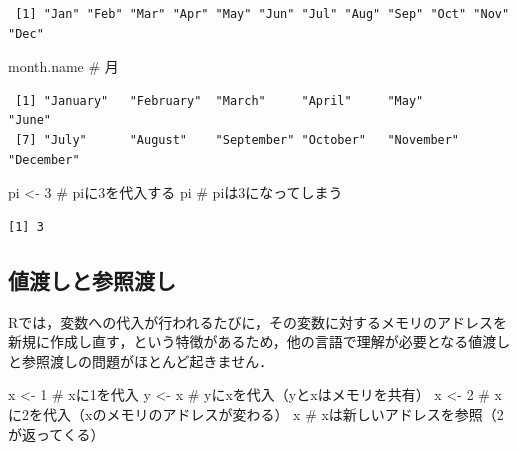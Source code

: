 \documentclass[
  letterpaper,
  DIV=11,
  numbers=noendperiod]{scrreprt}
\newenvironment{Shaded}{\begin{snugshade}}{\end{snugshade}}
\newcommand{\CommentTok}[1]{\textcolor[rgb]{0.37,0.37,0.37}{#1}}
\newcommand{\DecValTok}[1]{\textcolor[rgb]{0.68,0.00,0.00}{#1}}
\newcommand{\NormalTok}[1]{\textcolor[rgb]{0.00,0.23,0.31}{#1}}
\newcommand{\OtherTok}[1]{\textcolor[rgb]{0.00,0.23,0.31}{#1}}
\begin{document}
\begin{verbatim}
 [1] "Jan" "Feb" "Mar" "Apr" "May" "Jun" "Jul" "Aug" "Sep" "Oct" "Nov" "Dec"
\end{verbatim}

\begin{Shaded}
\begin{Highlighting}[]
\NormalTok{month.name }\CommentTok{\# 月}
\end{Highlighting}
\end{Shaded}

\begin{verbatim}
 [1] "January"   "February"  "March"     "April"     "May"       "June"     
 [7] "July"      "August"    "September" "October"   "November"  "December" 
\end{verbatim}

\begin{Shaded}
\begin{Highlighting}[]
\NormalTok{pi }\OtherTok{\textless{}{-}} \DecValTok{3} \CommentTok{\# piに3を代入する}
\NormalTok{pi }\CommentTok{\# piは3になってしまう}
\end{Highlighting}
\end{Shaded}

\begin{verbatim}
[1] 3
\end{verbatim}

\hypertarget{ux5024ux6e21ux3057ux3068ux53c2ux7167ux6e21ux3057}{%
\subsection{値渡しと参照渡し}\label{ux5024ux6e21ux3057ux3068ux53c2ux7167ux6e21ux3057}}

Rでは，変数への代入が行われるたびに，その変数に対するメモリのアドレスを新規に作成し直す，という特徴があるため，他の言語で理解が必要となる値渡しと参照渡しの問題がほとんど起きません．

\begin{Shaded}
\begin{Highlighting}[]
\NormalTok{x }\OtherTok{\textless{}{-}} \DecValTok{1} \CommentTok{\# xに1を代入}
\NormalTok{y }\OtherTok{\textless{}{-}}\NormalTok{ x }\CommentTok{\# yにxを代入（yとxはメモリを共有）}
\NormalTok{x }\OtherTok{\textless{}{-}} \DecValTok{2} \CommentTok{\# xに2を代入（xのメモリのアドレスが変わる）}
\NormalTok{x }\CommentTok{\# xは新しいアドレスを参照（2が返ってくる）}
\end{Highlighting}
\end{Shaded}
\end{document}
